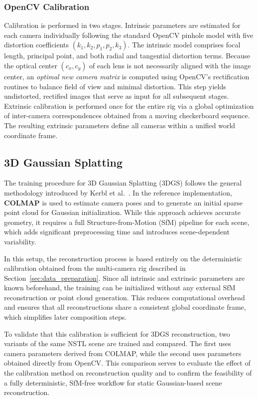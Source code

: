 \subsubsection{OpenCV Calibration}
Calibration is performed in two stages. Intrinsic parameters are estimated for each camera individually following the standard OpenCV pinhole model with five distortion coefficients \((k_1, k_2, p_1, p_2, k_3)\). The intrinsic model comprises focal length, principal point, and both radial and tangential distortion terms.
Because the optical center \((c_x, c_y)\) of each lens is not necessarily aligned with the image center, an \emph{optimal new camera matrix} is computed using OpenCV’s rectification routines to balance field of view and minimal distortion. This step yields undistorted, rectified images that serve as input for all subsequent stages.
Extrinsic calibration is performed once for the entire rig via a global optimization of inter-camera correspondences obtained from a moving checkerboard sequence. 
The resulting extrinsic parameters define all cameras within a unified world coordinate frame.  

\subsection{3D Gaussian Splatting}

The training procedure for 3D Gaussian Splatting (3DGS) follows the general methodology introduced by Kerbl et al.~\cite{kerbl3Dgaussians}. 
In the reference implementation, \textbf{COLMAP} is used to estimate camera poses and to generate an initial sparse point cloud for Gaussian initialization. 
While this approach achieves accurate geometry, it requires a full Structure-from-Motion (SfM) pipeline for each scene, which adds significant preprocessing time and introduces scene-dependent variability.

In this setup, the reconstruction process is based entirely on the deterministic calibration obtained from the multi-camera rig described in Section~\ref{sec:data_preparation}. 
Since all intrinsic and extrinsic parameters are known beforehand, the training can be initialized without any external SfM reconstruction or point cloud generation. 
This reduces computational overhead and ensures that all reconstructions share a consistent global coordinate frame, which simplifies later composition steps.

To validate that this calibration is sufficient for 3DGS reconstruction, two variants of the same NSTL scene are trained and compared. 
The first uses camera parameters derived from COLMAP, while the second uses parameters obtained directly from OpenCV. 
This comparison serves to evaluate the effect of the calibration method on reconstruction quality and to confirm the feasibility of a fully deterministic, SfM-free workflow for static Gaussian-based scene reconstruction.



